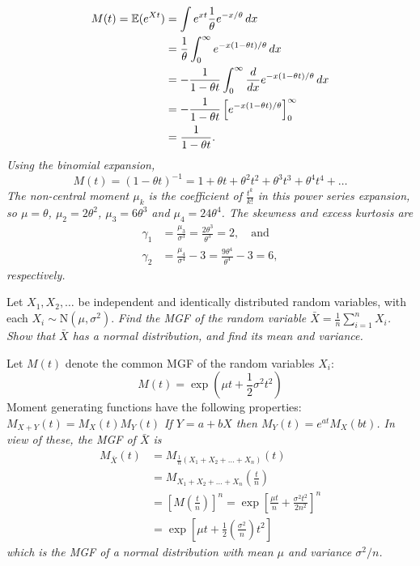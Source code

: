 \begin{exercise}
\begin{questions}
\begin{answer}
\ben
\it %
\begin{align*}
M(t) = \mathbb{E}(e^{Xt})
	& = \int e^{xt} \frac{1}{\theta}e^{-x/\theta}\,dx \\
	& = \frac{1}{\theta}\int_0^\infty e^{-x(1-\theta t)/\theta}\,dx \\
	& = -\frac{1}{1-\theta t}\int_0^\infty \frac{d}{dx} e^{-x(1-\theta t)/\theta}\,dx \\
	& = -\frac{1}{1-\theta t}\left[e^{-x(1-\theta t)/\theta}\right]_0^\infty \\
	& = \frac{1}{1-\theta t}.
\end{align*}
\it %
Using the binomial expansion,
\[
M(t)	= (1-\theta t)^{-1}
		= 1 + \theta t + \theta^2 t^2 + \theta ^3 t^3 + \theta ^4 t^4 + \ldots
\]
The non-central moment $\mu_k$ is the coefficient of $\frac{t^k}{k!}$ in this power series expansion, so $\mu = \theta$, $\mu_2 = 2\theta^2$, $\mu_3 = 6\theta^3$ and $\mu_4 = 24\theta^4$.
\it %
The skewness and excess kurtosis are
\begin{align*}
\gamma_1 	& = \frac{\mu_3}{\sigma^3} = \frac{2\theta^3}{\theta^3} = 2, \quad\text{and} \\
\gamma_2 	& = \frac{\mu_4}{\sigma^4} - 3 = \frac{9\theta^4}{\theta^4} -3 = 6,
\end{align*}
respectively.
\een
\end{answer}


\question
Let $X_1,X_2,\ldots$ be independent and identically distributed random variables, with each $X_i\sim\text{N}(\mu,\sigma^2)$.
\ben
\it Find the MGF of the random variable $\displaystyle\bar{X}=\frac{1}{n}\sum_{i=1}^{n} X_i$.
\it Show that $\bar{X}$ has a normal distribution, and find its mean and variance.           
\een
\begin{answer}
Let $M(t)$ denote the common MGF of the random variables $X_i$:
\[
M(t) = \exp\left(\mu t+\frac{1}{2}\sigma^2 t^2\right)
\]
Moment generating functions have the following properties:
\bit
\it $M_{X+Y}(t)=M_X(t)M_Y(t)$
\it If $Y=a+bX$ then $M_Y(t) = e^{at}M_X(bt)$.
\eit
In view of these, the MGF of $\bar{X}$ is
\begin{align*}
M_{\bar{X}}(t)
	& = M_{\frac{1}{n}(X_1+X_2+\ldots+X_n)}(t) \\ 
	& = M_{X_1+X_2+\ldots+X_n}\left(\frac{t}{n}\right) \\ 
	& = \left[M\left(\frac{t}{n}\right)\right]^n 
	 = \exp\left[\frac{\mu t}{n} + \frac{\sigma^2 t^2}{2n^2}\right]^n \\
	& = \exp\left[\mu t + \frac{1}{2}\left(\frac{\sigma^2}{n}\right) t^2\right]
\end{align*}
which is the MGF of a normal distribution with mean $\mu$ and variance $\sigma^2/n$.
\end{answer}




\end{questions}
\end{exercise}

